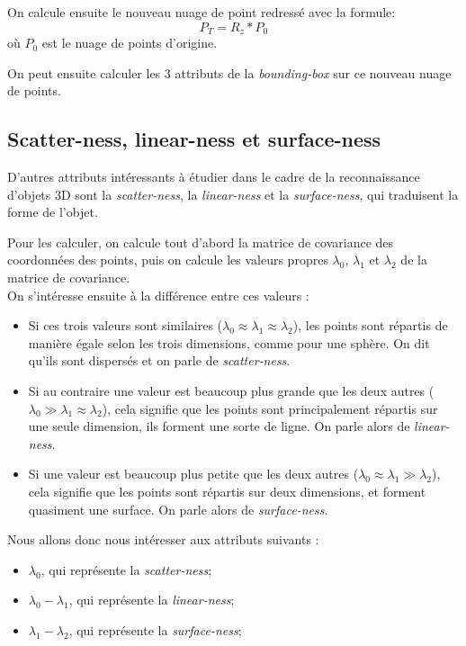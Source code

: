 		On calcule ensuite le nouveau nuage de point redressé avec la formule:
		\[ P_T = R_z * P_0\]
		où $P_0$ est le nuage de points d'origine.

		On peut ensuite calculer les 3 attributs de la \emph{bounding-box} sur ce nouveau nuage de points.


	\subsection{Scatter-ness, linear-ness et surface-ness}
		D'autres attributs intéressants à étudier dans le cadre de la reconnaissance d'objets 3D sont la \emph{scatter-ness}, la \emph{linear-ness} et la \emph{surface-ness}, qui traduisent la forme de l'objet. 

		Pour les calculer, on calcule tout d'abord la matrice de covariance des coordonnées des points, puis on calcule les valeurs propres $\lambda_0$, $\lambda_1$ et $\lambda_2$ de la matrice de covariance. \\

		On s’intéresse ensuite à la différence entre ces valeurs : 
		\begin{itemize}
			\item Si ces trois valeurs sont similaires ($\lambda_0 \approx \lambda_1 \approx \lambda_2$), les points sont répartis de manière égale selon les trois dimensions, comme pour une sphère. On dit qu'ils sont dispersés et on parle de \emph{scatter-ness}.
			\item Si au contraire une valeur est beaucoup plus grande que les deux autres ($\lambda_0 \gg \lambda_1 \approx \lambda_2$), cela signifie que les points sont principalement répartis sur une seule dimension, ils forment une sorte de ligne. On parle alors de \emph{linear-ness}.
			\item Si une valeur est beaucoup plus petite que les deux autres ($\lambda_0 \approx \lambda_1 \gg \lambda_2$), cela signifie que les points sont répartis sur deux dimensions, et forment quasiment une surface. On parle alors de \emph{surface-ness}.\\
		\end{itemize}

		Nous allons donc nous intéresser aux attributs suivants :
		\begin{itemize}
			\item $\lambda_0$, qui représente la \emph{scatter-ness};
			\item $\lambda_0 - \lambda_1$, qui représente la \emph{linear-ness};
			\item $\lambda_1 - \lambda_2$, qui représente la \emph{surface-ness};
		\end{itemize}

